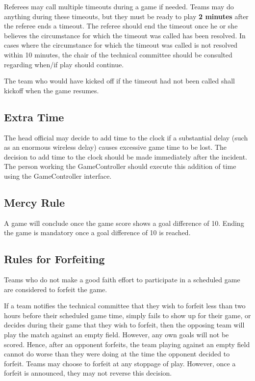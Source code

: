 \documentclass[12pt]{article}
\begin{document}
Referees may call multiple timeouts during a game if needed.  Teams may do anything during these timeouts, but they must be ready to play \textbf{2 minutes} after the referee ends a timeout.  The referee should end the timeout once he or she believes the circumstance for which the timeout was called has been resolved.  In cases where the circumstance for which the timeout was called is not resolved within 10 minutes, the chair of the technical committee should be consulted regarding when/if play should continue.

The team who would have kicked off if the timeout had not been called shall kickoff when the game resumes.

\subsection{Extra Time}
\label{sec:extra_time}
The head official may decide to add time to the clock if a substantial delay (such as an enormous wireless delay) causes excessive game time to be lost.  The decision to add time to the clock should be made immediately after the incident.  The person working the GameController should execute this addition of time using the GameController interface.

\subsection{Mercy Rule}
\label{sec:mercy_rule}
A game will conclude once the game score shows a goal difference of 10.  Ending the game is mandatory once a goal difference of 10 is reached.

\subsection{Rules for Forfeiting}
\label{sec:forfeit}

Teams who do not make a good faith effort to participate in a scheduled game are considered to forfeit the game.

If a team notifies the technical committee that they wish to forfeit less than two hours before their scheduled game time, simply fails to show up for their game, or decides during their game that they wish to forfeit, then the opposing team will play the match against an empty field.  However, any own goals will not be scored.  Hence, after an opponent forfeits, the team playing against an empty field cannot do worse than they were doing at the time the opponent decided to forfeit.  Teams may choose to forfeit at any stoppage of play.  However, once a forfeit is announced, they may not reverse this decision.
\end{document}
